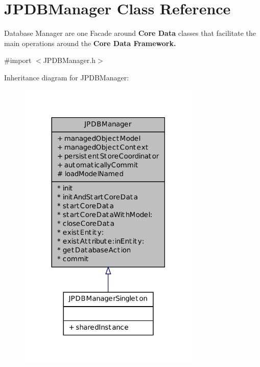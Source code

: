 \hypertarget{interface_j_p_d_b_manager}{
\section{JPDBManager Class Reference}
\label{interface_j_p_d_b_manager}
}


Database Manager are one Facade around {\bfseries Core Data} classes that facilitate the main operations around the {\bfseries Core Data Framework{\bfseries . }} 




{\ttfamily \#import $<$JPDBManager.h$>$}



Inheritance diagram for JPDBManager:
\nopagebreak
\begin{figure}[H]
\begin{center}
\leavevmode
\includegraphics[width=246pt]{interface_j_p_d_b_manager__inherit__graph}
\end{center}
\end{figure}

